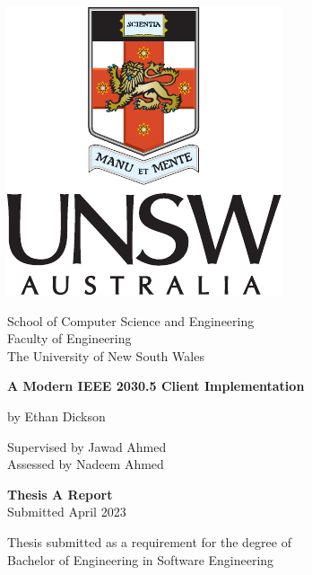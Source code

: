 \documentclass[]{unswthesis}
\begin{document}
\begin{titlepage}

\vspace*{\fill}

\begin{center}
    \includegraphics{crest}
\end{center}

\vspace{0.5cm}

\begin{center}
    \Large{}School of Computer Science and Engineering\\
    Faculty of Engineering\\
    The University of New South Wales
\end{center}

\vspace{1cm}

\begin{center}
    \Huge \textbf{A Modern IEEE 2030.5 Client Implementation}
\end{center}

\vspace{0.1cm}

\begin{center}
    \Large{}
    by Ethan Dickson\\
    
    \vspace{0.5cm}
    
    Supervised by Jawad Ahmed\\
    Assessed by Nadeem Ahmed
\end{center}

\vspace{0.5cm}

\begin{center}
    \textbf{Thesis A Report}\\
    Submitted April 2023
    
    \vspace{0.5cm}
    
    Thesis submitted as a requirement for the degree of\\
    Bachelor of Engineering in Software Engineering
\end{center}

\vspace*{\fill}

\end{titlepage}





\tableofcontents

\mainmatter



\end{document}

